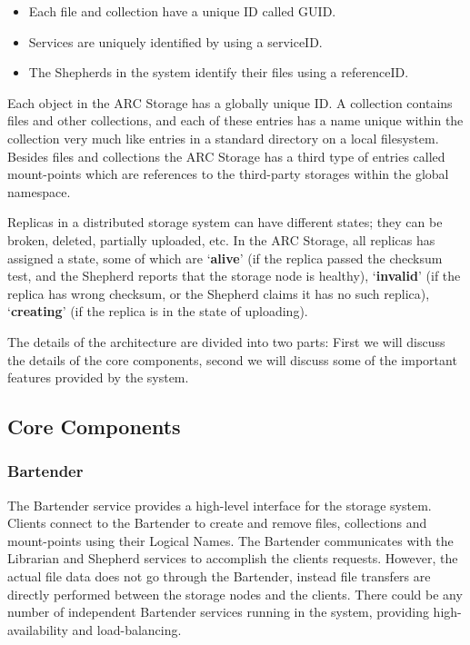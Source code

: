 \documentclass[final]{ieee}
\begin{document}
\begin{itemize} 
\item Each  file and collection have a unique ID called GUID.
\item Services are uniquely identified by using a serviceID. 
\item The Shepherds in the system identify their files using a referenceID.
\end{itemize} 

Each object in the ARC Storage has a globally
unique ID. A collection contains files and other collections,
and each of these entries has a name unique within the collection very
much like entries in a standard directory on a local filesystem. Besides
files and collections the ARC Storage has a third type of entries
called mount-points which are references to the third-party storages
within the global namespace.

Replicas in a distributed storage system can have different states;
they can be broken, deleted, partially uploaded, etc. In the
ARC Storage, all replicas has assigned a state, some of which are
`\textbf{alive}' (if the replica passed the checksum test, and the
Shepherd reports that the storage node is healthy), `\textbf{invalid}'
(if the replica has wrong checksum, or the Shepherd claims it has no
such replica), `\textbf{creating}' (if the replica is in
the state of uploading).

The details of the
architecture are divided into two parts: First we will discuss the
details of the core components, second we will discuss some of the
important features provided by the system.

\subsection{Core Components} 
\subsubsection{Bartender}
\label{Bartender}
The Bartender service provides a high-level interface for the storage
system. Clients connect to the Bartender to create and remove
files, collections and mount-points using their Logical Names. The
Bartender communicates 
with the Librarian and Shepherd services to accomplish the clients
requests. However, the actual file data does not go through the
Bartender, instead file
transfers are directly performed between the storage nodes and the
clients. There could be any number of independent Bartender services
running in the system, providing high-availability and
load-balancing. 
\end{document}
